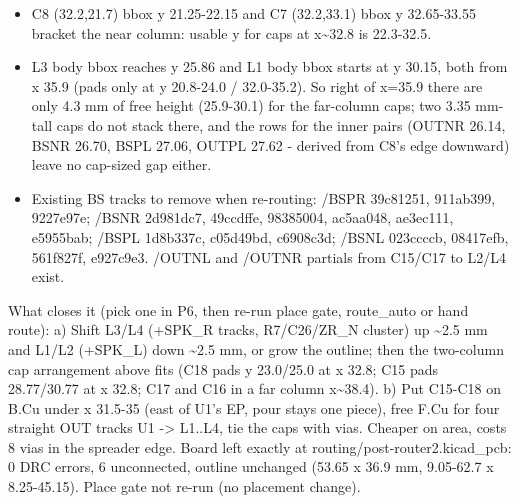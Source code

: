 \documentclass[11pt]{article}
\begin{document}
\begin{itemize}
\item C8 (32.2,21.7) bbox y 21.25-22.15 and C7 (32.2,33.1) bbox y 32.65-33.55 bracket the near column:
usable y for caps at x\textasciitilde{}32.8 is 22.3-32.5.
\item L3 body bbox reaches y 25.86 and L1 body bbox starts at y 30.15, both from x 35.9 (pads only at
y 20.8-24.0 / 32.0-35.2). So right of x=35.9 there are only 4.3 mm of free height (25.9-30.1)
for the far-column caps; two 3.35 mm-tall caps do not stack there, and the rows for the inner
pairs (OUTNR 26.14, BSNR 26.70, BSPL 27.06, OUTPL 27.62 - derived from C8's edge downward) leave
no cap-sized gap either.
\item Existing BS tracks to remove when re-routing: /BSPR 39c81251, 911ab399, 9227e97e; /BSNR 2d981dc7,
49ccdffe, 98385004, ac5aa048, ae3ec111, e5955bab; /BSPL 1d8b337c, c05d49bd, c6908c3d;
/BSNL 023ccccb, 08417efb, 561f827f, e927c9e3. /OUTNL and /OUTNR partials from C15/C17 to L2/L4 exist.
\end{itemize}
What closes it (pick one in P6, then re-run place gate, route\_auto or hand route): a) Shift L3/L4 (+SPK\_R tracks, R7/C26/ZR\_N cluster) up \textasciitilde{}2.5 mm and L1/L2 (+SPK\_L) down \textasciitilde{}2.5 mm, or grow the outline; then the two-column cap arrangement above fits (C18 pads y 23.0/25.0 at x 32.8; C15 pads 28.77/30.77 at x 32.8; C17 and C16 in a far column x\textasciitilde{}38.4). b) Put C15-C18 on B.Cu under x 31.5-35 (east of U1's EP, pour stays one piece), free F.Cu for four straight OUT tracks U1 -\textgreater{} L1..L4, tie the caps with vias. Cheaper on area, costs 8 vias in the spreader edge. Board left exactly at routing/post-router2.kicad\_pcb: 0 DRC errors, 6 unconnected, outline unchanged (53.65 x 36.9 mm, 9.05-62.7 x 8.25-45.15). Place gate not re-run (no placement change).
\end{document}
